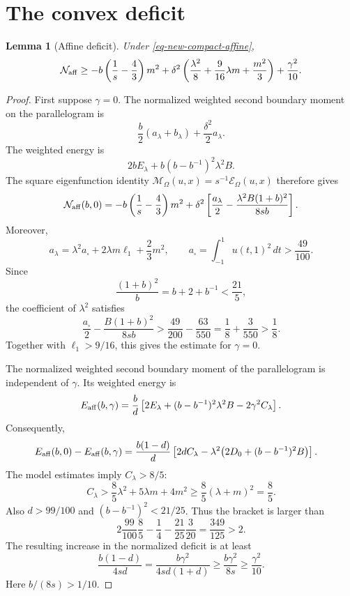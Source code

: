 \documentclass[11pt]{amsart}
\newtheorem{lemma}[theorem]{Lemma}
\theoremstyle{remark}\newtheorem{remark}[theorem]{Remark}
\numberwithin{equation}{section}
\begin{document}
\section{The convex deficit}

\begin{lemma}[Affine deficit]
\label{lem-new-affine-baseline}
Under \eqref{eq-new-compact-affine},
\[
\mathcal N_{\rm aff}\ge
-b\left(\frac1s-\frac43\right)m^2+
\delta^2\left(\frac{\lambda^2}{8}
+\frac9{16}\lambda m+\frac{m^2}{3}\right)
+\frac{\gamma^2}{10}.
\]
\end{lemma}

\begin{proof}
First suppose \(\gamma=0\). The normalized weighted second boundary
moment on the parallelogram is
\[
\frac b2(a_\lambda+b_\lambda)
+\frac{\delta^2}{2}a_\lambda.
\]
The weighted energy is
\[
2bE_\lambda+b(b-b^{-1})^2\lambda^2B.
\]
The square eigenfunction identity
\(\mathcal M_\Omega(u,x)=s^{-1}\mathcal E_\Omega(u,x)\)
therefore gives
\[
\mathcal N_{\rm aff}(b,0)=
-b\left(\frac1s-\frac43\right)m^2+
\delta^2\left[
\frac{a_\lambda}{2}
-\frac{\lambda^2B(1+b)^2}{8sb}\right].
\]
Moreover,
\[
a_\lambda=\lambda^2a_\square+2\lambda m\ell_1+\frac23m^2,
\qquad a_\square=\int_{-1}^1u(t,1)^2\,dt>\frac{49}{100}.
\]
Since
\[
\frac{(1+b)^2}{b}=b+2+b^{-1}<\frac{21}{5},
\]
the coefficient of \(\lambda^2\) satisfies
\[
\frac{a_\square}{2}-\frac{B(1+b)^2}{8sb}
>\frac{49}{200}-\frac{63}{550}
=\frac18+\frac3{550}>\frac18.
\]
Together with \(\ell_1>9/16\), this gives the estimate for \(\gamma=0\).

The normalized weighted second boundary moment of the parallelogram is
independent of \(\gamma\). Its weighted energy is
\[
E_{\rm aff}(b,\gamma)=
\frac bd\left[
2E_\lambda+(b-b^{-1})^2\lambda^2B
-2\gamma^2C_\lambda\right].
\]
Consequently,
\[
\begin{split}
E_{\rm aff}(b,0)-E_{\rm aff}(b,\gamma)
={}&\frac{b(1-d)}d
\left[2dC_\lambda
-\lambda^2\bigl(2D_0+(b-b^{-1})^2B\bigr)\right].
\end{split}
\]
The model estimates imply \(C_\lambda>8/5\):
\[
C_\lambda>
\frac85\lambda^2+5\lambda m+4m^2
\ge\frac85(\lambda+m)^2=\frac85.
\]
Also \(d>99/100\) and \((b-b^{-1})^2<21/25\).
Thus the bracket is larger than
\[
2\frac{99}{100}\frac85-\frac14-\frac{21}{25}\frac3{20}
=\frac{349}{125}>2.
\]
The resulting increase in the normalized deficit is at least
\[
\frac{b(1-d)}{4sd}
=\frac{b\gamma^2}{4sd(1+d)}
\ge\frac{b\gamma^2}{8s}
\ge\frac{\gamma^2}{10}.
\]
Here \(b/(8s)>1/10\).
\end{proof}
\end{document}
